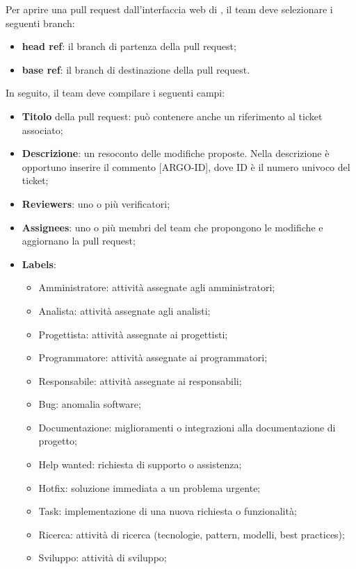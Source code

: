 \par Per aprire una pull request dall'interfaccia web di , il team deve selezionare i seguenti branch:
\begin{itemize}
  \item \textbf{head ref}: il branch di partenza della pull request;
  \item \textbf{base ref}: il branch di destinazione della pull request.
\end{itemize}
\par In seguito, il team deve compilare i seguenti campi:
\begin{itemize}
  \item \textbf{Titolo} della pull request: può contenere anche un riferimento al ticket  associato;
  \item \textbf{Descrizione}: un resoconto delle modifiche proposte. Nella descrizione è opportuno inserire il commento [ARGO-ID], dove ID è il numero univoco del ticket;
  \item \textbf{Reviewers}: uno o più verificatori;
  \item \textbf{Assignees}: uno o più membri del team che propongono le modifiche e aggiornano la pull request;
  \item \textbf{Labels}:
  \begin{itemize}
    \item Amministratore: attività assegnate agli amministratori;
    \item Analista: attività assegnate agli analisti;
    \item Progettista: attività assegnate ai progettisti;
    \item Programmatore: attività assegnate ai programmatori;
    \item Responsabile: attività assegnate ai responsabili;
    \item Bug: anomalia software;
    \item Documentazione: miglioramenti o integrazioni alla documentazione di progetto;
    \item Help wanted: richiesta di supporto o assistenza;
    \item Hotfix: soluzione immediata a un problema urgente;
    \item Task: implementazione di una nuova richiesta o funzionalità;
    \item Ricerca: attività di ricerca (tecnologie, pattern, modelli, best practices);
    \item Sviluppo: attività di sviluppo;

\end{itemize}
\end{itemize}
